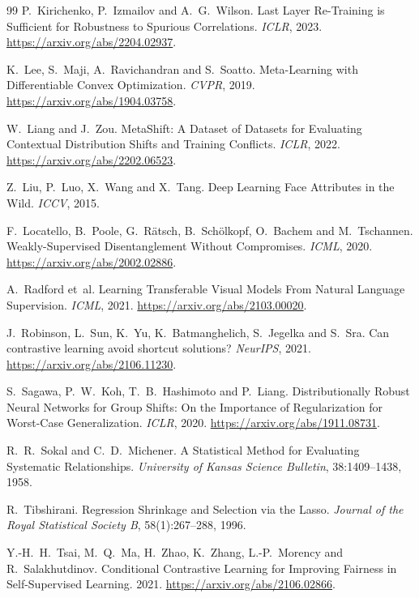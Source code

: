 \documentclass{article}
\begin{document}
\begin{thebibliography}{99}
P.~Kirichenko, P.~Izmailov and A.~G.~Wilson.
Last Layer Re-Training is Sufficient for Robustness to Spurious Correlations. \emph{ICLR}, 2023.
\url{https://arxiv.org/abs/2204.02937}.

K.~Lee, S.~Maji, A.~Ravichandran and S.~Soatto.
Meta-Learning with Differentiable Convex Optimization. \emph{CVPR}, 2019.
\url{https://arxiv.org/abs/1904.03758}.

W.~Liang and J.~Zou.
MetaShift: A Dataset of Datasets for Evaluating Contextual Distribution Shifts and Training Conflicts.
\emph{ICLR}, 2022. \url{https://arxiv.org/abs/2202.06523}.

Z.~Liu, P.~Luo, X.~Wang and X.~Tang.
Deep Learning Face Attributes in the Wild. \emph{ICCV}, 2015.

F.~Locatello, B.~Poole, G.~R\"atsch, B.~Sch\"olkopf, O.~Bachem and M.~Tschannen.
Weakly-Supervised Disentanglement Without Compromises. \emph{ICML}, 2020.
\url{https://arxiv.org/abs/2002.02886}.

A.~Radford et~al.
Learning Transferable Visual Models From Natural Language Supervision. \emph{ICML}, 2021.
\url{https://arxiv.org/abs/2103.00020}.

J.~Robinson, L.~Sun, K.~Yu, K.~Batmanghelich, S.~Jegelka and S.~Sra.
Can contrastive learning avoid shortcut solutions? \emph{NeurIPS}, 2021.
\url{https://arxiv.org/abs/2106.11230}.

S.~Sagawa, P.~W.~Koh, T.~B.~Hashimoto and P.~Liang.
Distributionally Robust Neural Networks for Group Shifts: On the Importance of Regularization for
Worst-Case Generalization. \emph{ICLR}, 2020. \url{https://arxiv.org/abs/1911.08731}.

R.~R.~Sokal and C.~D.~Michener.
A Statistical Method for Evaluating Systematic Relationships.
\emph{University of Kansas Science Bulletin}, 38:1409--1438, 1958.

R.~Tibshirani.
Regression Shrinkage and Selection via the Lasso.
\emph{Journal of the Royal Statistical Society B}, 58(1):267--288, 1996.

Y.-H.~H.~Tsai, M.~Q.~Ma, H.~Zhao, K.~Zhang, L.-P.~Morency and R.~Salakhutdinov.
Conditional Contrastive Learning for Improving Fairness in Self-Supervised Learning. 2021.
\url{https://arxiv.org/abs/2106.02866}.


\end{thebibliography}
\end{document}
